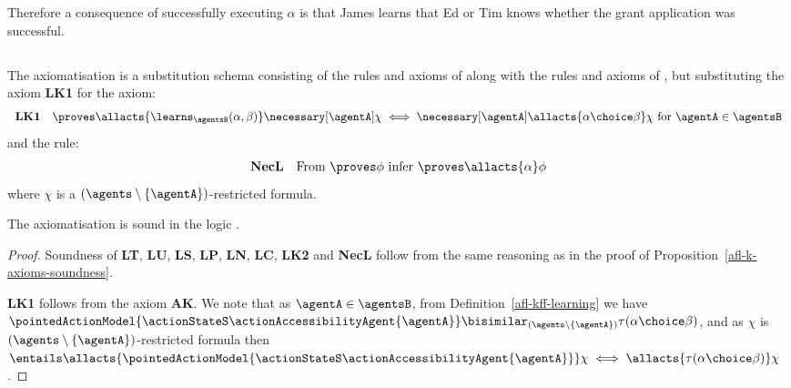 \documentclass[twoside]{aiml14}
\begin{document}
\begin{example}
      Therefore a consequence of successfully executing $\alpha$ is that James
      learns that Ed or Tim knows whether the grant application was successful.
  \end{example}

  \subsection{\classKFF{}}

  \begin{definition}\label{afl-kff-axioms}
      The axiomatisation \axiomAflKFF{} is a substitution schema consisting of the
      rules and axioms of \axiomKFF{} 
      along with the rules and axioms of \axiomAflK{},
      but substituting the \axiomAflK{} axiom {\bf LK1} for the axiom:
      $$
      \begin{array}{rl}
          {\bf LK1} & \proves \allacts{\learns_\agentsB (\alpha, \beta)} \necessary[\agentA] \chi \iff \necessary[\agentA] \allacts{\alpha \choice \beta} \chi \text{ for } \agentA \in \agentsB\\
      \end{array}
      $$
      and the rule:
      $$
      \begin{array}{rl}
          {\bf NecL} & \text{From $\proves \phi$ infer $\proves \allacts{\alpha} \phi$}
      \end{array}
      $$
      where $\chi$ is a $(\agents \setminus \{\agentA\})$-restricted formula.
  \end{definition}

  \begin{proposition}\label{afl-kff-axioms-soundness}
      The axiomatisation \axiomAflKFF{} is sound in the logic \logicAmlKFF{}.
  \end{proposition}

  \begin{proof}
      Soundness of {\bf LT}, {\bf LU}, {\bf LS}, {\bf LP}, {\bf LN}, {\bf LC},
      {\bf LK2} and {\bf NecL} follow from the same reasoning as in the proof
      of Proposition~\ref{afl-k-axioms-soundness}.

      {\bf LK1} follows from the \axiomAmlKFF{} axiom {\bf AK}.
      We note that as $\agentA \in \agentsB$, from Definition~\ref{afl-kff-learning}
      we have $\pointedActionModel{\actionStateS \actionAccessibilityAgent{\agentA}} \bisimilar_{(\agents \setminus \{\agentA\})} \tau(\alpha \choice \beta)$,
      and as $\chi$ is $(\agents \setminus \{\agentA\})$-restricted formula then
      $\entails \allacts{\pointedActionModel{\actionStateS \actionAccessibilityAgent{\agentA}}} \chi \iff \allacts{\tau(\alpha \choice \beta)} \chi$.
  \end{proof}
\end{document}
